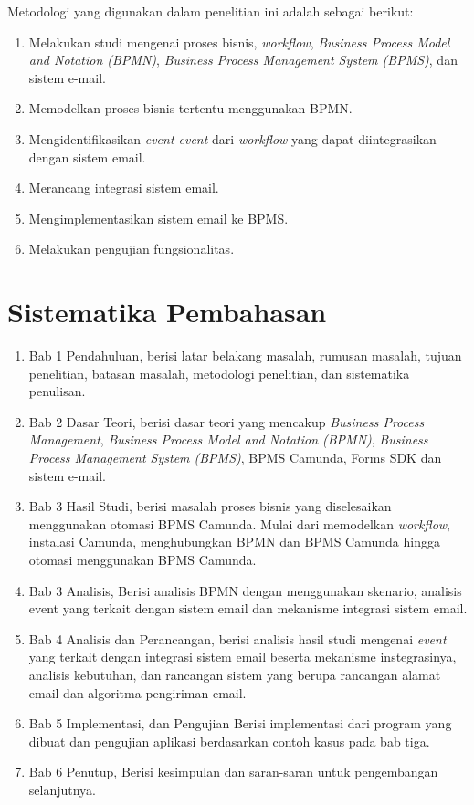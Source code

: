 Metodologi yang digunakan dalam penelitian ini adalah sebagai berikut:
\begin{enumerate}
	\item Melakukan studi mengenai proses bisnis, \textit{workflow}, \textit{Business Process Model and Notation (BPMN)}, \textit{Business Process Management System (BPMS)}, dan sistem e-mail. 
	\item Memodelkan proses bisnis tertentu menggunakan BPMN.
	\item Mengidentifikasikan \textit{event-event} dari \textit{workflow} yang dapat diintegrasikan dengan sistem email.
	\item Merancang integrasi sistem email.
	\item Mengimplementasikan sistem email ke BPMS.
	\item Melakukan pengujian fungsionalitas.
\end{enumerate}




\section{Sistematika Pembahasan}
\label{sec:sispem}

\begin{enumerate}
	\item Bab 1 Pendahuluan, berisi latar belakang masalah, rumusan masalah, tujuan penelitian, batasan masalah, metodologi penelitian, dan sistematika penulisan.
	\item Bab 2 Dasar Teori, berisi dasar teori yang mencakup \textit{Business Process Management}, \textit{Business Process Model and Notation (BPMN)}, \textit{Business Process Management System (BPMS)}, BPMS Camunda, Forms SDK dan sistem e-mail.
	\item Bab 3 Hasil Studi, berisi masalah proses bisnis yang diselesaikan menggunakan otomasi BPMS Camunda. Mulai dari memodelkan \textit{workflow}, instalasi Camunda, menghubungkan BPMN dan BPMS Camunda hingga otomasi menggunakan BPMS Camunda.
	\item Bab 3 Analisis, Berisi analisis BPMN dengan menggunakan skenario, analisis event yang terkait dengan sistem email  dan mekanisme integrasi sistem email.
	\item Bab 4 Analisis dan Perancangan, berisi analisis hasil studi mengenai \textit{event} yang terkait dengan integrasi sistem email beserta mekanisme instegrasinya, analisis kebutuhan, dan rancangan sistem yang berupa rancangan alamat email dan algoritma pengiriman email.
	\item Bab 5 Implementasi, dan Pengujian Berisi implementasi dari program yang dibuat dan pengujian aplikasi berdasarkan contoh kasus pada bab tiga.
	\item Bab 6 Penutup, Berisi kesimpulan dan saran-saran untuk pengembangan selanjutnya.
\end{enumerate}


